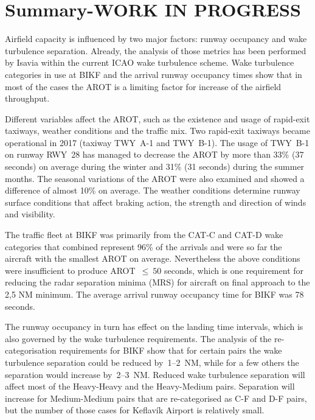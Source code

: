 


\chapter{Summary-WORK IN PROGRESS}\label{cha:summary}

Airfield capacity is influenced by two major factors: runway occupancy and wake turbulence separation. Already, the analysis of those metrics has been performed by Isavia within the current ICAO wake turbulence scheme. Wake turbulence categories in use at BIKF and the arrival runway occupancy times show that in most of the cases the AROT is a limiting factor for increase of the airfield throughput.  

Different variables affect the AROT, such as the existence and usage of rapid-exit taxiways, weather conditions and the traffic mix. Two rapid-exit taxiways became operational in 2017 (taxiway TWY~A-1 and TWY~B-1). The usage of TWY~B-1 on runway RWY~28 has managed to decrease the AROT by more than 33\% (37 seconds) on average during the winter and 31\% (31 seconds) during the summer months. The seasonal variations of the AROT were also examined and showed a difference of almost 10\% on average. The weather conditions determine runway surface conditions that affect braking action, the strength and direction of winds and visibility. 

The traffic fleet at BIKF was primarily from the CAT-C and CAT-D wake categories that combined represent 96\% of the arrivals and were so far the aircraft with the smallest AROT on average. Nevertheless the above conditions were insufficient to produce AROT~$\leq~50$ seconds, which is one requirement for reducing the radar separation minima (MRS) for aircraft on final approach to the 2,5 NM minimum. The average arrival runway occupancy time for BIKF was 78 seconds. 

The runway occupancy in turn has effect on the landing time intervals, which is also governed by the wake turbulence requirements.
The analysis of the re-categorisation requirements for BIKF show that for certain pairs the wake turbulence separation could be reduced by~1--2~NM, while for a few others the separation would increase by~2--3~NM. Reduced wake turbulence separation will affect most of the Heavy-Heavy and the Heavy-Medium pairs. Separation will increase for Medium-Medium pairs that are re-categorised as C-F and D-F pairs, but the number of those cases for Keflavík Airport is relatively small.



